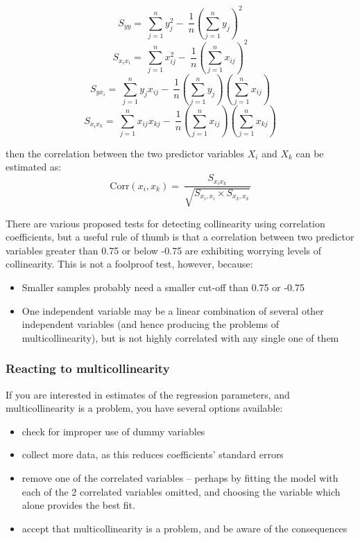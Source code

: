 \documentclass[12pt,a4paper,openany,twoside]{report}
\theoremstyle{definition}
\theoremstyle{remark}
\theoremstyle{plain}
\theoremstyle{definition}
\theoremstyle{definition}
\theoremstyle{definition}
\theoremstyle{remark}
\begin{document}
\[S_{yy} = \ \sum_{j = 1}^{n}{y_{j}^{2}} - \ \frac{1}{n}\left({\sum_{j = 1}^{n}y_{j}}\right)^{2}\]
\[S_{x_{i}x_{i}} = \ \sum_{j = 1}^{n}{x_{ij}^{2}} - \ \frac{1}{n}\left({\sum_{j = 1}^{n}x_{ij}}\right)^{2}\]
\[S_{yx_{i}} = \ \sum_{j = 1}^{n}{y_{j}x_{ij}} - \ \frac{1}{n}\left(\sum_{j = 1}^{n}{y_{j}}\right)\left(\sum_{j = 1}^{n}x_{ij}\right)\]
\[S_{x_{i}x_{k}} = \ \sum_{j = 1}^{n}{x_{ij}x_{kj}} - \ \frac{1}{n}\left(\sum_{j = 1}^{n}{x_{ij}}\right)\left(\sum_{j = 1}^{n}x_{kj}\right)\]

then the correlation between the two predictor variables \(X_{i}\) and \(X_{k}\) can be estimated as:
\[\text{Corr}(x_{i}, x_{k}) = \ \frac{S_{x_{i}x_{k}}}{\sqrt{S_{x_{i},x_{i}}\times S_{x_{k},x_{k}}}}\]

There are various proposed tests for detecting collinearity using
correlation coefficients, but a useful rule of thumb is that a
correlation between two predictor variables greater than 0.75 or below
-0.75 are exhibiting worrying levels of collinearity. This is not a
foolproof test, however, because:

\begin{itemize}
\item
  Smaller samples probably need a smaller cut-off than 0.75 or -0.75
\item
  One independent variable may be a linear combination of several other
  independent variables (and hence producing the problems of
  multicollinearity), but is not highly correlated with any single one
  of them
\end{itemize}

\hypertarget{reacting-to-multicollinearity}{%
\subsubsection*{Reacting to multicollinearity}\label{reacting-to-multicollinearity}}

If you are interested in estimates of the regression parameters, and
multicollinearity is a problem, you have several options available:

\begin{itemize}
\item
  check for improper use of dummy variables
\item
  collect more data, as this reduces coefficients' standard errors
\item
  remove one of the correlated variables -- perhaps by fitting the model
  with each of the 2 correlated variables omitted, and choosing the
  variable which alone provides the best fit.
\item
  accept that multicollinearity is a problem, and be aware of the
  consequences
\end{itemize}
\end{document}
